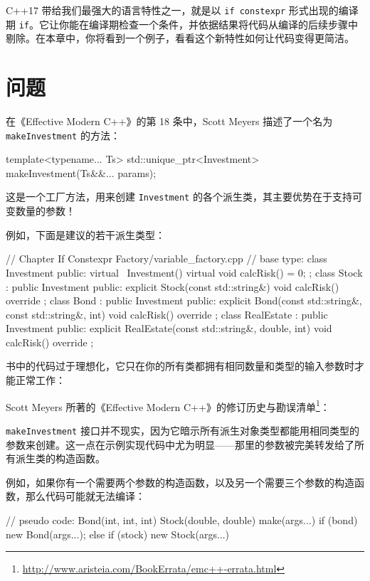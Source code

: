 C++17 带给我们最强大的语言特性之一，就是以 \texttt{if constexpr} 形式出现的编译期 \texttt{if}。它让你能在编译期检查一个条件，并依据结果将代码从编译的后续步骤中剔除。在本章中，你将看到一个例子，看看这个新特性如何让代码变得更简洁。

\section{问题}

在《Effective Modern C++》的第 18 条中，Scott Meyers 描述了一个名为 \texttt{makeInvestment} 的方法：

\begin{codebox}[cpp]
template<typename... Ts>
std::unique_ptr<Investment>
makeInvestment(Ts&&... params);
\end{codebox}

这是一个工厂方法，用来创建 \texttt{Investment} 的各个派生类，其主要优势在于支持可变数量的参数！

例如，下面是建议的若干派生类型：

\begin{codebox}[cpp]
// Chapter If Constexpr Factory/variable_factory.cpp
// base type:
class Investment
{
public:
virtual ~Investment() { }
virtual void calcRisk() = 0;
};
class Stock : public Investment
{
public:
explicit Stock(const std::string&) { }
void calcRisk() override { }
};
class Bond : public Investment
{
public:
explicit Bond(const std::string&, const std::string&, int) { }
void calcRisk() override { }
};
class RealEstate : public Investment
{
public:
explicit RealEstate(const std::string&, double, int) { }
void calcRisk() override { }
};
\end{codebox}

书中的代码过于理想化，它只在你的所有类都拥有相同数量和类型的输入参数时才能正常工作：

Scott Meyers 所著的《Effective Modern C++》的修订历史与勘误清单\footnote{\url{http://www.aristeia.com/BookErrata/emc++-errata.html}}：

\begin{myQuote}
\texttt{makeInvestment} 接口并不现实，因为它暗示所有派生对象类型都能用相同类型的参数来创建。这一点在示例实现代码中尤为明显——那里的参数被完美转发给了所有派生类的构造函数。
\end{myQuote}

例如，如果你有一个需要两个参数的构造函数，以及另一个需要三个参数的构造函数，那么代码可能就无法编译：

\begin{codebox}[cpp]
// pseudo code:
Bond(int, int, int) { }
Stock(double, double) { }
make(args...)
{
if (bond)
new Bond(args...);
else if (stock)
new Stock(args...)
}
\end{codebox}

